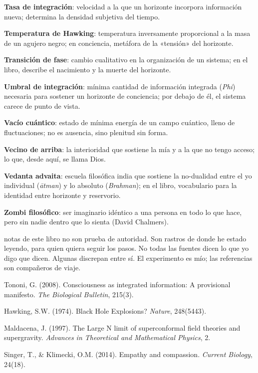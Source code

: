\glos \textbf{Tasa de integración}: velocidad a la que un horizonte incorpora información nueva; determina la densidad subjetiva del tiempo.

\glos \textbf{Temperatura de Hawking}: temperatura inversamente proporcional a la masa de un agujero negro; en conciencia, metáfora de la «tensión» del horizonte.

\glos \textbf{Transición de fase}: cambio cualitativo en la organización de un sistema; en el libro, describe el nacimiento y la muerte del horizonte.

\glos \textbf{Umbral de integración}: mínima cantidad de información integrada (\emph{Phi}) necesaria para sostener un horizonte de conciencia; por debajo de él, el sistema carece de punto de vista.

\glos \textbf{Vacío cuántico}: estado de mínima energía de un campo cuántico, lleno de fluctuaciones; no es ausencia, sino plenitud sin forma.

\glos \textbf{Vecino de arriba}: la interioridad que sostiene la mía y a la que no tengo acceso; lo que, desde aquí, se llama Dios.

\glos \textbf{Vedanta advaita}: escuela filosófica india que sostiene la no-dualidad entre el yo individual (\emph{ātman}) y lo absoluto (\emph{Brahman}); en el libro, vocabulario para la identidad entre horizonte y reservorio.


\glos \textbf{Zombi filosófico}: ser imaginario idéntico a una persona en todo lo que hace, pero sin nadie dentro que lo sienta (David Chalmers).

\noindent {} notas de este libro no son prueba de autoridad. Son rastros de donde he estado leyendo, para quien quiera seguir los pasos. No todas las fuentes dicen lo que yo digo que dicen. Algunas discrepan entre sí. El experimento es mío; las referencias son compañeros de viaje.

 Tononi, G. (2008). Consciousness as integrated information: A provisional manifesto. \emph{The Biological Bulletin}, 215(3).

 Hawking, S.W. (1974). Black Hole Explosions? \emph{Nature}, 248(5443).

 Maldacena, J. (1997). The Large N limit of superconformal field theories and supergravity. \emph{Advances in Theoretical and Mathematical Physics}, 2.

 Singer, T., \& Klimecki, O.M. (2014). Empathy and compassion. \emph{Current Biology}, 24(18).


